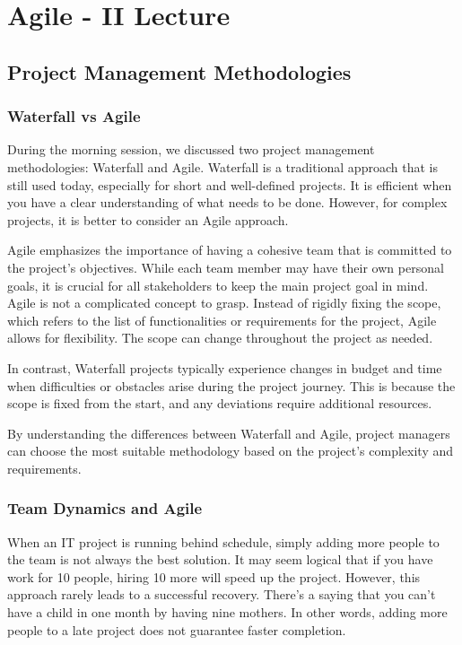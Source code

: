 \section{Agile - II Lecture}

\subsection{Project Management Methodologies}

\subsubsection{Waterfall vs Agile}

During the morning session, we discussed two project management
methodologies: Waterfall and Agile. Waterfall is a traditional approach
that is still used today, especially for short and well-defined
projects. It is efficient when you have a clear understanding of what
needs to be done. However, for complex projects, it is better to
consider an Agile approach.

Agile emphasizes the importance of having a cohesive team that is
committed to the project's objectives. While each team member may have
their own personal goals, it is crucial for all stakeholders to keep the
main project goal in mind. Agile is not a complicated concept to grasp.
Instead of rigidly fixing the scope, which refers to the list of
functionalities or requirements for the project, Agile allows for
flexibility. The scope can change throughout the project as needed.

In contrast, Waterfall projects typically experience changes in budget
and time when difficulties or obstacles arise during the project
journey. This is because the scope is fixed from the start, and any
deviations require additional resources.

By understanding the differences between Waterfall and Agile, project
managers can choose the most suitable methodology based on the project's
complexity and requirements.

\subsubsection{Team Dynamics and Agile}

When an IT project is running behind schedule, simply adding more people
to the team is not always the best solution. It may seem logical that if
you have work for 10 people, hiring 10 more will speed up the project.
However, this approach rarely leads to a successful recovery. There's a
saying that you can't have a child in one month by having nine mothers.
In other words, adding more people to a late project does not guarantee
faster completion.

